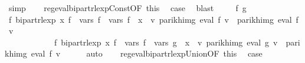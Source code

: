 \begin{isabellebody}
\ simp\isanewline
\ \ \isamarkupfalse%
\ reg{\isacharunderscore}{\kern0pt}eval{\isacharunderscore}{\kern0pt}bipart{\isacharunderscore}{\kern0pt}rlexp{\isacharunderscore}{\kern0pt}Const{\isacharbrackleft}{\kern0pt}OF\ this{\isacharbrackright}{\kern0pt}\ \isamarkupfalse%
\ {\isacharquery}{\kern0pt}case\ \isamarkupfalse%
\ blast\isanewline
{}\isamarkupfalse%
\isanewline
\ \ \isamarkupfalse%
\ {\isacharparenleft}{\kern0pt}{}\ f\ g{\isacharparenright}{\kern0pt}\isanewline
\ \ \isamarkupfalse%
\ \isamarkupfalse%
\ {\isachardoublequoteopen}{\isasymexists}f{\isacharprime}{\kern0pt}{\isachardot}{\kern0pt}\ bipart{\isacharunderscore}{\kern0pt}rlexp\ x\ f{\isacharprime}{\kern0pt}\ {\isasymand}\ vars\ f{\isacharprime}{\kern0pt}\ {\isacharequal}{\kern0pt}\ vars\ f\ {\isasymunion}\ {\isacharbraceleft}{\kern0pt}x{\isacharbraceright}{\kern0pt}\ {\isasymand}\ {\isacharparenleft}{\kern0pt}{\isasymforall}v{\isachardot}{\kern0pt}\ parikh{\isacharunderscore}{\kern0pt}img\ {\isacharparenleft}{\kern0pt}eval\ f\ v{\isacharparenright}{\kern0pt}\ {\isacharequal}{\kern0pt}\ parikh{\isacharunderscore}{\kern0pt}img\ {\isacharparenleft}{\kern0pt}eval\ f{\isacharprime}{\kern0pt}\ v{\isacharparenright}{\kern0pt}{\isacharparenright}{\kern0pt}{\isachardoublequoteclose}\isanewline
\ \ \ \ \ \ \ \ \ \ \ \ {\isachardoublequoteopen}{\isasymexists}f{\isacharprime}{\kern0pt}{\isachardot}{\kern0pt}\ bipart{\isacharunderscore}{\kern0pt}rlexp\ x\ f{\isacharprime}{\kern0pt}\ {\isasymand}\ vars\ f{\isacharprime}{\kern0pt}\ {\isacharequal}{\kern0pt}\ vars\ g\ {\isasymunion}\ {\isacharbraceleft}{\kern0pt}x{\isacharbraceright}{\kern0pt}\ {\isasymand}\ {\isacharparenleft}{\kern0pt}{\isasymforall}v{\isachardot}{\kern0pt}\ parikh{\isacharunderscore}{\kern0pt}img\ {\isacharparenleft}{\kern0pt}eval\ g\ v{\isacharparenright}{\kern0pt}\ {\isacharequal}{\kern0pt}\ parikh{\isacharunderscore}{\kern0pt}img\ {\isacharparenleft}{\kern0pt}eval\ f{\isacharprime}{\kern0pt}\ v{\isacharparenright}{\kern0pt}{\isacharparenright}{\kern0pt}{\isachardoublequoteclose}\isanewline
\ \ \ \ \isamarkupfalse%
\ auto\isanewline
\ \ \isamarkupfalse%
\ reg{\isacharunderscore}{\kern0pt}eval{\isacharunderscore}{\kern0pt}bipart{\isacharunderscore}{\kern0pt}rlexp{\isacharunderscore}{\kern0pt}Union{\isacharbrackleft}{\kern0pt}OF\ this{\isacharbrackright}{\kern0pt}\ \isamarkupfalse%
\ {\isacharquery}{\kern0pt}case\ \isamarkupfalse%

\end{isabellebody}
